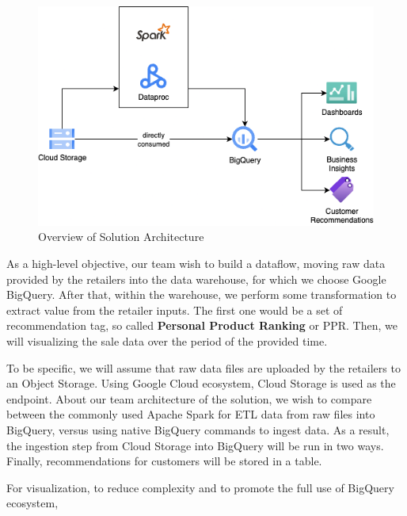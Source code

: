 \begin{figure}[htp]
    \centering
    \includegraphics[width=0.5\linewidth]{images/solution_architecture.png}
    \caption{Overview of Solution Architecture}
\end{figure}

As a high-level objective, our team wish to build a dataflow, moving raw data provided by the
retailers into the data warehouse, for which we choose Google BigQuery. After that, within the
warehouse, we perform some transformation to extract value from the retailer inputs. The first one
would be a set of recommendation tag, so called \textbf{Personal Product Ranking} or PPR. Then, we
will visualizing the sale data over the period of the provided time.

To be specific, we will assume that raw data files are uploaded by the retailers to an Object
Storage. Using Google Cloud ecosystem, Cloud Storage is used as the endpoint. About our team
architecture of the solution, we wish to compare between the commonly used Apache Spark for ETL data
from raw files into BigQuery, versus using native BigQuery commands to ingest data. As a result, the
ingestion step from Cloud Storage into BigQuery will be run in two ways. Finally, recommendations
for customers will be stored in a table.

For visualization, to reduce complexity and to promote the full use of BigQuery ecosystem, 